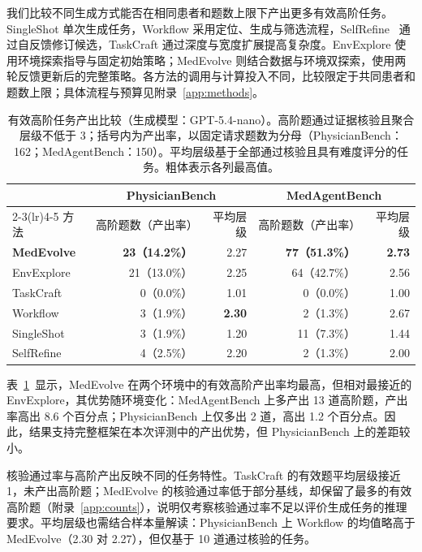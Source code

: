我们比较不同生成方式能否在相同患者和题数上限下产出更多有效高阶任务。SingleShot 单次生成任务，Workflow 采用定位、生成与筛选流程，SelfRefine~\citep{madaan2023selfrefine} 通过自反馈修订候选，TaskCraft 通过深度与宽度扩展提高复杂度。EnvExplore 使用环境探索指导与固定初始策略；MedEvolve 则结合数据与环境双探索，使用两轮反馈更新后的完整策略。各方法的调用与计算投入不同，比较限定于共同患者和题数上限；具体流程与预算见附录~\ref{app:methods}。

\begin{table}[t]
\centering
\setlength{\tabcolsep}{7pt}
\renewcommand{\arraystretch}{1.15}
\begin{tabular*}{\textwidth}{@{\extracolsep{\fill}}lrrrr@{}}
\toprule
 & \multicolumn{2}{c}{PhysicianBench} & \multicolumn{2}{c}{MedAgentBench} \\
\cmidrule(lr){2-3}\cmidrule(lr){4-5}
方法 & 高阶题数（产出率） & 平均层级 & 高阶题数（产出率） & 平均层级 \\
\midrule
\textbf{MedEvolve} & \textbf{23（14.2\%）} & 2.27 & \textbf{77（51.3\%）} & \textbf{2.73} \\
EnvExplore & 21（13.0\%） & 2.25 & 64（42.7\%） & 2.56 \\
TaskCraft & 0（0.0\%） & 1.01 & 0（0.0\%） & 1.00 \\
Workflow & 3（1.9\%） & \textbf{2.30} & 2（1.3\%） & 2.67 \\
SingleShot & 3（1.9\%） & 1.20 & 11（7.3\%） & 1.44 \\
SelfRefine & 4（2.5\%） & 2.20 & 2（1.3\%） & 2.00 \\
\bottomrule
\end{tabular*}
\caption{有效高阶任务产出比较（生成模型：GPT-5.4-nano）。高阶题通过证据核验且聚合层级不低于 3；括号内为产出率，以固定请求题数为分母（PhysicianBench：162；MedAgentBench：150）。平均层级基于全部通过核验且具有难度评分的任务。粗体表示各列最高值。}
\label{tab:exp1}
\end{table}

表~\ref{tab:exp1}~显示，MedEvolve 在两个环境中的有效高阶产出率均最高，但相对最接近的 EnvExplore，其优势随环境变化：MedAgentBench 上多产出 13 道高阶题，产出率高出 8.6 个百分点；PhysicianBench 上仅多出 2 道，高出 1.2 个百分点。因此，结果支持完整框架在本次评测中的产出优势，但 PhysicianBench 上的差距较小。

核验通过率与高阶产出反映不同的任务特性。TaskCraft 的有效题平均层级接近 1，未产出高阶题；MedEvolve 的核验通过率低于部分基线，却保留了最多的有效高阶题（附录~\ref{app:counts}），说明仅考察核验通过率不足以评价生成任务的推理要求。平均层级也需结合样本量解读：PhysicianBench 上 Workflow 的均值略高于 MedEvolve（2.30 对 2.27），但仅基于 10 道通过核验的任务。

